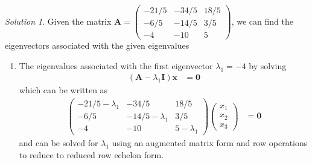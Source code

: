 \documentclass[
]{book}
\providecommand{\tightlist}{%
  \setlength{\itemsep}{0pt}\setlength{\parskip}{0pt}}
\theoremstyle{definition}
\theoremstyle{definition}
\theoremstyle{definition}
\theoremstyle{definition}
\theoremstyle{remark}
\newtheorem*{solution}{Solution}
\begin{document}
\begin{solution}
Given the matrix \(\mathbf{A} = \begin{pmatrix} -21/5 & -34/5 & 18/5 \\ -6/5 & -14/5 & 3/5 \\ -4 & -10 & 5 \end{pmatrix}\), we can find the eigenvectors associated with the given eigenvalues

\begin{enumerate}
\def\labelenumi{\alph{enumi})}
\tightlist
\item
  The eigenvalues associated with the first eigenvector \(\lambda_1 = -4\) by solving
  \[
  \begin{aligned}
  \left( \mathbf{A} - \lambda_1 \mathbf{I} \right) \mathbf{x} & = \mathbf{0}
  \end{aligned}
  \]
  which can be written as
  \[
  \begin{aligned}
  \begin{pmatrix} 
  -21/5  - \lambda_1 & -34/5 & 18/5 \\
  -6/5 & -14/5 - \lambda_1 & 3/5 \\
  -4 & -10 & 5 - \lambda_1
  \end{pmatrix} \begin{pmatrix} x_1 \\ x_2 \\ x_3 \end{pmatrix} & = \mathbf{0}
  \end{aligned}
  \]
  and can be solved for \(\lambda_1\) using an augmented matrix form and row operations to reduce to reduced row echelon form.
\end{enumerate}


\end{solution}
\end{document}
